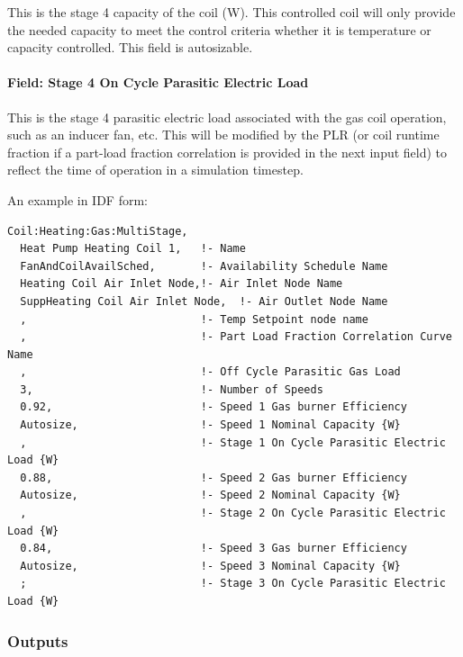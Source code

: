 This is the stage 4 capacity of the coil (W). This controlled coil will only provide the needed capacity to meet the control criteria whether it is temperature or capacity controlled. This field is autosizable.

\paragraph{Field: Stage 4 On Cycle Parasitic Electric Load}\label{field-stage-4-parasitic-electric-load}

This is the stage 4 parasitic electric load associated with the gas coil operation, such as an inducer fan, etc. This will be modified by the PLR (or coil runtime fraction if a part-load fraction correlation is provided in the next input field) to reflect the time of operation in a simulation timestep.

An example in IDF form:

\begin{lstlisting}
Coil:Heating:Gas:MultiStage,
  Heat Pump Heating Coil 1,   !- Name
  FanAndCoilAvailSched,       !- Availability Schedule Name
  Heating Coil Air Inlet Node,!- Air Inlet Node Name
  SuppHeating Coil Air Inlet Node,  !- Air Outlet Node Name
  ,                           !- Temp Setpoint node name
  ,                           !- Part Load Fraction Correlation Curve Name
  ,                           !- Off Cycle Parasitic Gas Load
  3,                          !- Number of Speeds
  0.92,                       !- Speed 1 Gas burner Efficiency
  Autosize,                   !- Speed 1 Nominal Capacity {W}
  ,                           !- Stage 1 On Cycle Parasitic Electric Load {W}
  0.88,                       !- Speed 2 Gas burner Efficiency
  Autosize,                   !- Speed 2 Nominal Capacity {W}
  ,                           !- Stage 2 On Cycle Parasitic Electric Load {W}
  0.84,                       !- Speed 3 Gas burner Efficiency
  Autosize,                   !- Speed 3 Nominal Capacity {W}
  ;                           !- Stage 3 On Cycle Parasitic Electric Load {W}
\end{lstlisting}

\subsubsection{Outputs}\label{outputs-10-002}

